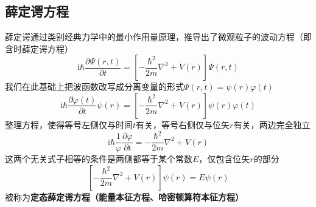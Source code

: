 \subsection{薛定谔方程}
薛定谔通过类别经典力学中的最小作用量原理，推导出了微观粒子的波动方程（即含时薛定谔方程）
$$
    \mathrm{i}\hbar\frac{\partial \Psi(r, t)}{\partial t} = \left[-\frac{\hbar^2}{2m}\nabla^2 + V(r)\right]\Psi(r, t)
$$
我们在此基础上把波函数改写成分离变量的形式$\Psi(r,t)=\psi(r)\varphi(t)$
$$
    \mathrm{i}\hbar\frac{\partial \varphi(t)}{\partial t}\psi(r) = \left[-\frac{\hbar^2}{2m}\nabla^2 + V(r)\right]\psi(r)\varphi(t)
$$
整理方程，使得等号左侧仅与时间$t$有关，等号右侧仅与位矢$r$有关，两边完全独立
$$
    \mathrm{i}\hbar\frac{1}{\varphi}\frac{\partial \varphi}{\partial t} = -\frac{\hbar^2}{2m}\nabla^2 + V(r)
$$
这两个无关式子相等的条件是两侧都等于某个常数$E$，仅包含位矢$r$的部分
$$
    \left[-\frac{\hbar^2}{2m}\nabla^2 + V(r)\right]\psi(r) = E\psi(r)
$$
被称为\textbf{定态薛定谔方程（能量本征方程、哈密顿算符本征方程）}


